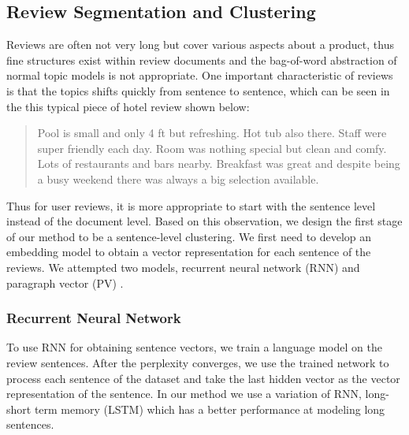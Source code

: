 \subsection{Review Segmentation and Clustering}
Reviews are often not very long but cover various aspects about a product, thus fine structures exist within review documents and the bag-of-word abstraction of normal topic models is not appropriate. One important characteristic of reviews is that the topics shifts quickly from sentence to sentence, which can be seen in the this typical piece of hotel review shown below:
\begin{quote}
 Pool is small and only 4 ft but refreshing. Hot tub also there. Staff were super friendly each day. Room was nothing special but clean and comfy. Lots of restaurants and bars nearby. Breakfast was great and despite being a busy weekend there was always a big selection available.
\end{quote}
Thus for user reviews, 
it is more appropriate to start with the sentence level instead of the document level.
Based on this observation, we design the first stage of our method to be a 
sentence-level clustering.
We first need to develop an embedding model to obtain 
a vector representation for each sentence of the reviews. 
We attempted two models, recurrent neural network (RNN) and paragraph
vector (PV) \cite{le2014distributed}.

\subsubsection{Recurrent Neural Network}
To use RNN for obtaining sentence vectors, we train a language model on the review sentences. After the perplexity converges, we use the trained network to process each sentence of the dataset and take the last hidden vector as the vector representation of the sentence. In our method we use a variation of RNN, long-short term memory (LSTM) \cite{hochreiter1997long} which has a better performance at modeling long sentences.

